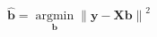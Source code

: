 \documentclass[10pt]{article}
\begin{document}
\[\boldsymbol{\hat{b}} = \operatorname*{argmin}_{\boldsymbol b} \left\lVert \boldsymbol y - \boldsymbol X \boldsymbol b \right\rVert^2
\]
\end{document}
